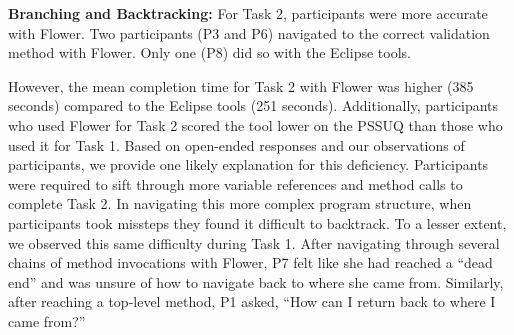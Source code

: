 \documentclass[conference]{IEEEtran}
\begin{document}
\textbf{Branching and Backtracking:}
For Task 2, participants were more accurate with Flower.
Two participants (P3 and P6) navigated to the correct validation method with Flower.
Only one (P8) did so with the Eclipse tools.

However, the mean completion time for Task 2 with Flower was higher (385 seconds) compared to the Eclipse tools (251 seconds).
Additionally, participants who used Flower  for Task 2 scored the tool lower on the PSSUQ than those who used it for Task 1.
Based on open-ended responses and our observations of participants, we provide one likely explanation for this deficiency.
Participants were required to sift through more variable references and method calls to complete Task 2.
In navigating this more complex program structure, when participants took missteps they found it difficult to backtrack.
To a lesser extent, we observed this same difficulty during Task 1.
After navigating through several chains of method invocations with Flower, P7 felt like she had reached a ``dead end'' and was unsure of how to navigate back to where she came from.
Similarly, after reaching a top-level method, P1 asked, ``How can I return back to where I came from?''




\end{document}
